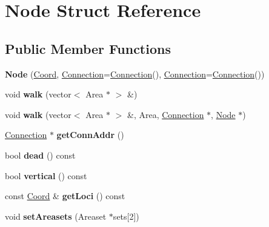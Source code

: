 \hypertarget{classNode}{\section{Node Struct Reference}
\label{classNode}
}
\subsection*{Public Member Functions}
\begin{DoxyCompactItemize}
\item 
\hypertarget{classNode_a8967a8ea2f7e45ab5d400eb4fb5a5b8f}{{\bfseries Node} (\hyperlink{structCoord}{Coord}, \hyperlink{structConnection}{Connection}=\hyperlink{structConnection}{Connection}(), \hyperlink{structConnection}{Connection}=\hyperlink{structConnection}{Connection}())}\label{classNode_a8967a8ea2f7e45ab5d400eb4fb5a5b8f}

\item 
\hypertarget{classNode_aa7323fcd726f9d02be5a36017b983b2d}{void {\bfseries walk} (vector$<$ Area $\ast$ $>$ \&)}\label{classNode_aa7323fcd726f9d02be5a36017b983b2d}

\item 
\hypertarget{classNode_aed462601aaebbbf910008326032619c6}{void {\bfseries walk} (vector$<$ Area $\ast$ $>$ \&, Area, \hyperlink{structConnection}{Connection} $\ast$, \hyperlink{classNode}{Node} $\ast$)}\label{classNode_aed462601aaebbbf910008326032619c6}

\item 
\hypertarget{classNode_a84e440c7e885d9c9e2e72386a351ddb3}{\hyperlink{structConnection}{Connection} $\ast$ {\bfseries get\+Conn\+Addr} ()}\label{classNode_a84e440c7e885d9c9e2e72386a351ddb3}

\item 
\hypertarget{classNode_abef94e6f9dd2576fe364fd0cb8257d9e}{bool {\bfseries dead} () const }\label{classNode_abef94e6f9dd2576fe364fd0cb8257d9e}

\item 
\hypertarget{classNode_aa76d8f65bb797e4e84a4d9dbdd933294}{bool {\bfseries vertical} () const }\label{classNode_aa76d8f65bb797e4e84a4d9dbdd933294}

\item 
\hypertarget{classNode_aa125f823cfc1231e0ba5f50e6a742db6}{const \hyperlink{structCoord}{Coord} \& {\bfseries get\+Loci} () const }\label{classNode_aa125f823cfc1231e0ba5f50e6a742db6}

\item 
\hypertarget{classNode_a6450dca659f85cd33edbb8910811c9a1}{void {\bfseries set\+Areasets} (Areaset $\ast$sets\mbox{[}2\mbox{]})}\label{classNode_a6450dca659f85cd33edbb8910811c9a1}


\end{DoxyCompactItemize}
